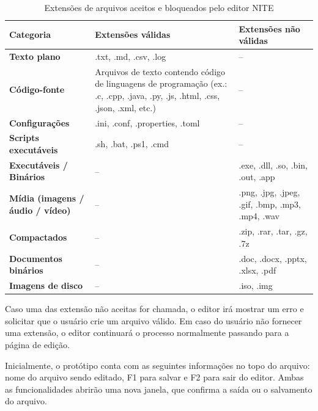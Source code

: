 \begin{table}[h]
    \centering
    \caption{Extensões de arquivos aceitos e bloqueados pelo editor NITE}
    \renewcommand{\arraystretch}{1.3}
    \setlength{\tabcolsep}{8pt}
    \begin{tabular}{@{}p{3.5cm}p{5.2cm}p{5.2cm}@{}}
        \toprule
        \textbf{Categoria} &
        \textbf{Extensões válidas} &
        \textbf{Extensões não válidas} \\
        \midrule
        \textbf{Texto plano} &
        .txt, .md, .csv, .log &
        – \\

        \textbf{Código-fonte} &
        Arquivos de texto contendo código de linguagens de programação
        (ex.: .c, .cpp, .java, .py, .js, .html, .css, .json, .xml, etc.) &
        – \\

        \textbf{Configurações} &
        .ini, .conf, .properties, .toml &
        – \\

        \textbf{Scripts executáveis} &
        .sh, .bat, .ps1, .cmd &
        – \\

        \textbf{Executáveis / Binários} &
        – &
        .exe, .dll, .so, .bin, .out, .app \\

        \textbf{Mídia (imagens / áudio / vídeo)} &
        – &
        .png, .jpg, .jpeg, .gif, .bmp, .mp3, .mp4, .wav \\

        \textbf{Compactados} &
        – &
        .zip, .rar, .tar, .gz, .7z \\

        \textbf{Documentos binários} &
        – &
        .doc, .docx, .pptx, .xlsx, .pdf \\

        \textbf{Imagens de disco} &
        – &
        .iso, .img \\
        \bottomrule
    \end{tabular}
\end{table}

Caso uma das extensão não aceitas for chamada, o editor irá mostrar um erro e solicitar que o usuário crie um arquivo válido. Em caso do usuário
não fornecer uma extensão, o editor continuará o processo normalmente passando para a página de edição.

Inicialmente, o protótipo conta com as seguintes informações no topo do arquivo: nome do arquivo sendo editado, F1 para salvar e F2 para sair
do editor. Ambas as funcionalidades abrirão uma nova janela, que confirma a saída ou o salvamento do arquivo.


